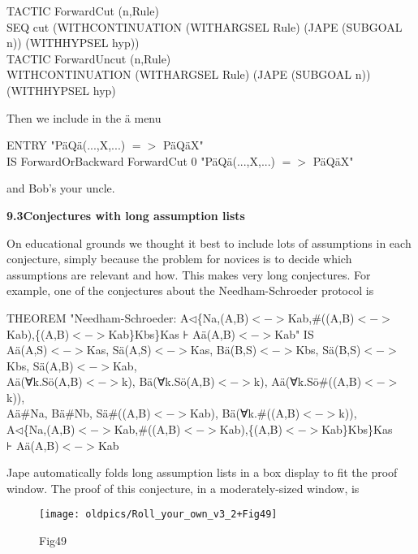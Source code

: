 \documentclass[11pt]{book}
\newcommand{\tab}{\hspace{5mm}}
\begin{document}
TACTIC ForwardCut (n,Rule)\\
\tab SEQ cut (WITHCONTINUATION (WITHARGSEL Rule) (JAPE (SUBGOAL n)) (WITHHYPSEL hyp))\\
TACTIC ForwardUncut (n,Rule)\\
\tab WITHCONTINUATION (WITHARGSEL Rule) (JAPE (SUBGOAL n)) (WITHHYPSEL hyp)


Then we include in the \"{a} menu

ENTRY "P\"{a}Q\"{a}(...,X,...) $=>$ P\"{a}Q\"{a}X"\\
\tab IS ForwardOrBackward ForwardCut 0 "P\"{a}Q\"{a}(...,X,...) $=>$ P\"{a}Q\"{a}X"


and Bob's your uncle.


\textbf{{\large 9.3\tab Conjectures with long assumption lists}}


On educational grounds we thought it best to include lots of assumptions in each conjecture, simply because the problem for novices is to decide which assumptions are relevant and how. This makes very long conjectures. For example, one of the conjectures about the Needham-Schroeder protocol is

{\small THEOREM "Needham-Schroeder: A$\triangleleft$\{Na,(A,B)$<->$Kab,\#((A,B)$<->$Kab),\{(A,B)$<->$Kab\}Kbs\}Kas ⊦ A\"{a}(A,B)$<->$Kab" IS  \\
\tab \tab A\"{a}(A,S)$<->$Kas, S\"{a}(A,S)$<->$Kas, B\"{a}(B,S)$<->$Kbs, S\"{a}(B,S)$<->$Kbs, S\"{a}(A,B)$<->$Kab,\\
\tab \tab A\"{a}(∀k.S\"{o}(A,B)$<->$k), B\"{a}(∀k.S\"{o}(A,B)$<->$k), A\"{a}(∀k.S\"{o}\#((A,B)$<->$k)), \\
\tab \tab A\"{a}\#Na, B\"{a}\#Nb, S\"{a}\#((A,B)$<->$Kab), B\"{a}(∀k.\#((A,B)$<->$k)), \\
\tab \tab A$\triangleleft$\{Na,(A,B)$<->$Kab,\#((A,B)$<->$Kab),\{(A,B)$<->$Kab\}Kbs\}Kas \\
\tab \tab ⊦ A\"{a}(A,B)$<->$Kab}


Jape automatically folds long assumption lists in a box display to fit the proof window. The proof of this conjecture, in a moderately-sized window, is

\begin{figure}[htbp] \begin{center} \texttt{[image: oldpics/Roll\_your\_own\_v3\_2+Fig49]} \caption{Fig49} \end{center} \end{figure}
\end{document}
